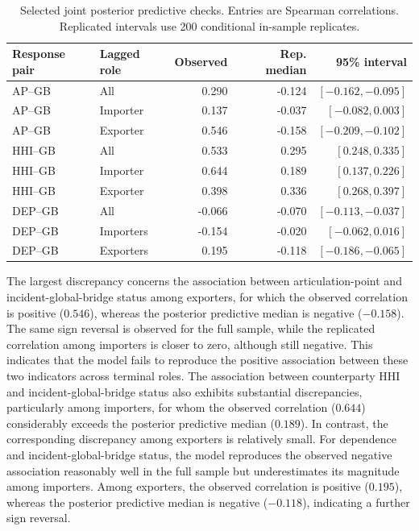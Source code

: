 \documentclass[pdftex,12pt,openright,a4paper,oneside]{book}
\begin{document}
\begin{table}[htbp]
\centering
\small
\caption{Selected joint posterior predictive checks. Entries are Spearman correlations. 
Replicated intervals use 200 conditional in-sample replicates.}
\label{tab:joint_ppc}
\begin{tabular}{llrrr}
\hline
Response pair & Lagged role & Observed & Rep. median & 95\% interval \\
\hline
AP--GB & All & 0.290 & -0.124 & $[-0.162,-0.095]$ \\
AP--GB & Importer & 0.137 & -0.037 & $[-0.082,0.003]$ \\
AP--GB & Exporter & 0.546 & -0.158 & $[-0.209,-0.102]$ \\
HHI--GB & All & 0.533 & 0.295 & $[0.248,0.335]$ \\
HHI--GB & Importer & 0.644 & 0.189 & $[0.137,0.226]$ \\
HHI--GB & Exporter & 0.398 & 0.336 & $[0.268,0.397]$ \\
DEP--GB & All & -0.066 & -0.070 & $[-0.113,-0.037]$ \\
DEP--GB & Importers	& -0.154 & -0.020 & $[-0.062,0.016]$ \\
DEP--GB & Exporters	& 0.195 & -0.118 & $[-0.186,-0.065]$ \\
\hline
\end{tabular}
\end{table}

The largest discrepancy concerns the association between articulation-point 
and incident-global-bridge status among exporters, for which the observed 
correlation is positive ($0.546$), whereas the posterior predictive median 
is negative ($-0.158$). The same sign reversal is observed for the full 
sample, while the replicated correlation among importers is closer to zero, 
although still negative. This indicates that the model fails to reproduce 
the positive association between these two indicators across terminal roles.
The association between counterparty HHI and incident-global-bridge status 
also exhibits substantial discrepancies, particularly among importers, for 
whom the observed correlation ($0.644$) considerably exceeds the posterior 
predictive median ($0.189$). In contrast, the corresponding discrepancy 
among exporters is relatively small. For dependence and incident-global-bridge 
status, the model reproduces the observed negative association reasonably 
well in the full sample but underestimates its magnitude among importers. 
Among exporters, the observed correlation is positive ($0.195$), whereas 
the posterior predictive median is negative ($-0.118$), indicating a further sign reversal.
\end{document}
